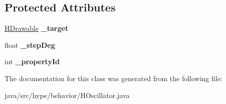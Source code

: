 \subsection*{Protected Attributes}
\begin{DoxyCompactItemize}
\item 
\hypertarget{classhype_1_1behavior_1_1_h_oscillator_af0894f7446ea5ec658c4c472d4436ef5}{\hyperlink{classhype_1_1drawable_1_1_h_drawable}{H\-Drawable} {\bfseries \-\_\-target}}\label{classhype_1_1behavior_1_1_h_oscillator_af0894f7446ea5ec658c4c472d4436ef5}

\item 
\hypertarget{classhype_1_1behavior_1_1_h_oscillator_acecd0b2ab56531647aa02f4347a2fa3d}{float {\bfseries \-\_\-step\-Deg}}\label{classhype_1_1behavior_1_1_h_oscillator_acecd0b2ab56531647aa02f4347a2fa3d}

\item 
\hypertarget{classhype_1_1behavior_1_1_h_oscillator_a0f5690e41080e6de41ca6e36379a9f9f}{int {\bfseries \-\_\-property\-Id}}\label{classhype_1_1behavior_1_1_h_oscillator_a0f5690e41080e6de41ca6e36379a9f9f}

\end{DoxyCompactItemize}


The documentation for this class was generated from the following file\-:\begin{DoxyCompactItemize}
\item 
java/src/hype/behavior/H\-Oscillator.\-java\end{DoxyCompactItemize}
